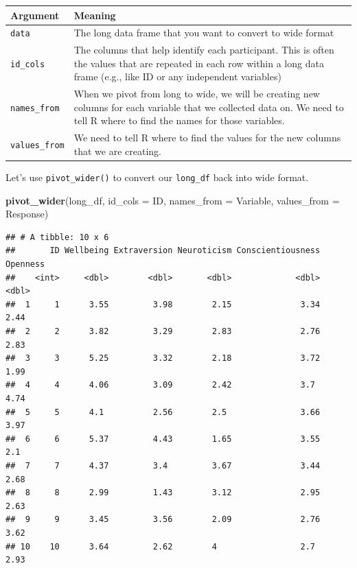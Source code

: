 \documentclass[
]{book}
\newenvironment{Shaded}{\begin{snugshade}}{\end{snugshade}}
\newcommand{\AttributeTok}[1]{\textcolor[rgb]{0.13,0.29,0.53}{#1}}
\newcommand{\FunctionTok}[1]{\textcolor[rgb]{0.13,0.29,0.53}{\textbf{#1}}}
\newcommand{\NormalTok}[1]{#1}
\begin{document}
\begin{longtable}[]{@{}
  >{\raggedright\arraybackslash}p{}
  >{\raggedright\arraybackslash}p{}@{}}
\toprule\noalign{}
\begin{minipage}[b]{\linewidth}\raggedright
Argument
\end{minipage} & \begin{minipage}[b]{\linewidth}\raggedright
Meaning
\end{minipage} \\
\midrule\noalign{}
\endhead
\bottomrule\noalign{}
\endlastfoot
\texttt{data} & The long data frame that you want to convert to wide format \\
\texttt{id\_cols} & The columns that help identify each participant. This is often the values that are repeated in each row within a long data frame (e.g., like ID or any independent variables) \\
\texttt{names\_from} & When we pivot from long to wide, we will be creating new columns for each variable that we collected data on. We need to tell R where to find the names for those variables. \\
\texttt{values\_from} & We need to tell R where to find the values for the new columns that we are creating. \\
\end{longtable}

Let's use \texttt{pivot\_wider()} to convert our \texttt{long\_df} back into wide format.

\begin{Shaded}
\begin{Highlighting}[]
\FunctionTok{pivot\_wider}\NormalTok{(long\_df, }
            \AttributeTok{id\_cols =}\NormalTok{ ID, }
            \AttributeTok{names\_from =}\NormalTok{ Variable,}
            \AttributeTok{values\_from =}\NormalTok{ Response)}
\end{Highlighting}
\end{Shaded}

\begin{verbatim}
## # A tibble: 10 x 6
##       ID Wellbeing Extraversion Neuroticism Conscientiousness Openness
##    <int>     <dbl>        <dbl>       <dbl>             <dbl>    <dbl>
##  1     1      3.55         3.98        2.15              3.34     2.44
##  2     2      3.82         3.29        2.83              2.76     2.83
##  3     3      5.25         3.32        2.18              3.72     1.99
##  4     4      4.06         3.09        2.42              3.7      4.74
##  5     5      4.1          2.56        2.5               3.66     3.97
##  6     6      5.37         4.43        1.65              3.55     2.1 
##  7     7      4.37         3.4         3.67              3.44     2.68
##  8     8      2.99         1.43        3.12              2.95     2.63
##  9     9      3.45         3.56        2.09              2.76     3.62
## 10    10      3.64         2.62        4                 2.7      2.93
\end{verbatim}
\end{document}
